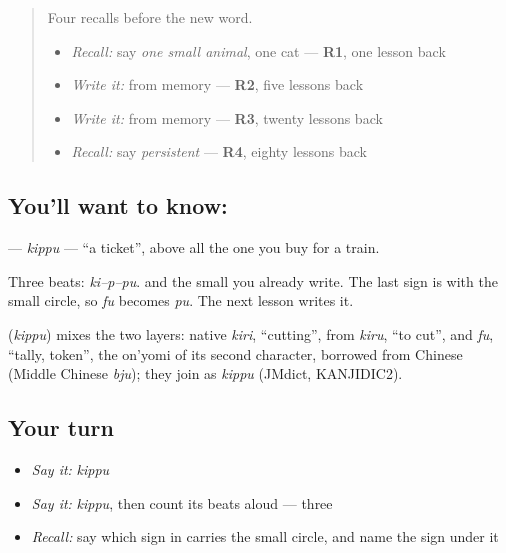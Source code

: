 \begin{quote}
Four recalls before the new word.

\begin{itemize}
\raggedright
  \item \emph{Recall:} say \emph{one small animal}, one cat — \textbf{R1}, one lesson back
  \item \emph{Write it:} \textbf{} from memory — \textbf{R2}, five lessons back
  \item \emph{Write it:} \textbf{} from memory — \textbf{R3}, twenty lessons back
  \item \emph{Recall:} say \emph{persistent} — \textbf{R4}, eighty lessons back
\end{itemize}
\end{quote}

\subsection*{You'll want to know: }
\textbf{} — \emph{kippu} — \textquotedblleft{}a ticket\textquotedblright{}, above all the one you buy for a train.

Three beats: \emph{ki–p–pu}. \textbf{} and the small \textbf{} you already write. The last sign is \textbf{} with the small circle, so \emph{fu} becomes \emph{pu}. The next lesson writes it.

\begin{cousinweb}
\textbf{} (\emph{kippu}) mixes the two layers: native \emph{kiri}, \textquotedblleft{}cutting\textquotedblright{}, from \emph{kiru}, \textquotedblleft{}to cut\textquotedblright{}, and \emph{fu}, \textquotedblleft{}tally, token\textquotedblright{}, the on'yomi of its second character, borrowed from Chinese (Middle Chinese \emph{bju}); they join as \emph{kippu} (JMdict, KANJIDIC2).
\end{cousinweb}

\subsection*{Your turn}
\begin{itemize}
\raggedright
  \item \emph{Say it:} \emph{kippu}
  \item \emph{Say it:} \emph{kippu}, then count its beats aloud — three
  \item \emph{Recall:} say which sign in \textbf{} carries the small circle, and name the sign under it
\end{itemize}

